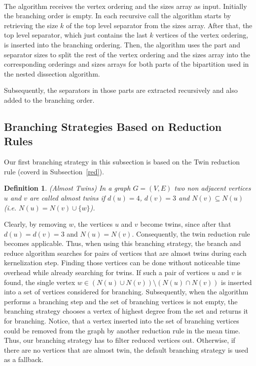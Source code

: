 \documentclass[]{article}
\newtheorem{definition}{Definition}
\begin{document}
\paragraph{}
The algorithm receives the vertex ordering and the sizes array as input. Initially the branching order is empty. In each recursive call the algorithm starts by retrieving the size $k$ of the top level separator from the sizes array. After that, the top level separator, which just contains the last $k$ vertices of the vertex ordering, is inserted into the branching ordering. Then, the algorithm uses the part and separator sizes to split the rest of the vertex ordering and the sizes array into the corresponding orderings and sizes arrays for both parts of the bipartition used in the nested dissection algorithm. 

Subsequently, the separators in those parts are extracted recursively and also added to the branching order.

\subsection{Branching Strategies Based on Reduction Rules} \label{red_strats}

Our first branching strategy in this subsection is based on the Twin reduction rule (coverd in Subsection~\ref{red}).

\begin{definition} (Almost Twins)
	In a graph $G=(V,E)$ two non adjacent vertices $u$ and $v$ are called almost twins if $d(u) = 4$, $d(v) = 3$ and $N(v)\subseteq N(u)$ (i.e. $N(u) = N(v) \cup \{w\}$). 
\end{definition}

Clearly, by removing $w$, the vertices $u$ and $v$ become twins, since after that $d(u)=d(v)=3$ and $N(u)=N(v)$. Consequently, the twin reduction rule becomes applicable. Thus, when using this branching strategy, the branch and reduce algorithm searches for pairs of vertices that are almost twins during each kernelization step. Finding those vertices can be done without noticeable time overhead while already searching for twins. If such a pair of vertices $u$ and $v$ is found, the single vertex $w\in (N(u)\cup N(v))\setminus(N(u) \cap N(v))$ is inserted into a set of vertices considered for branching. Subsequently, when the algorithm performs a branching step and the set of branching vertices is not empty, the branching strategy chooses a vertex of highest degree from the set and returns it for branching. Notice, that a vertex inserted into the set of branching vertices could be removed from the graph by another reduction rule in the mean time. Thus, our branching strategy has to filter reduced vertices out. Otherwise, if there are no vertices that are almost twin, the default branching strategy is used as a fallback. 
\end{document}
